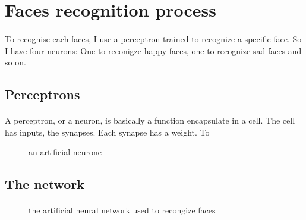 \section{Faces recognition process}

    \paragraph{}{
        To recognise each faces, I use a perceptron trained to recognize a 
     specific face. So I have four neurons: One to reconigze happy faces, one to
     recognize sad faces and so on.
    }

    \subsection{Perceptrons}

    \paragraph{}{
        A perceptron, or a neuron, is basically a function encapsulate in a 
     cell. The cell has inputs, the synapses. Each synapse has a weight. To
     
    }
    
    \begin{figure}[!h]
        \label{fig:neuron}
        \begin{center}
            
        \end{center}
        \caption{an artificial neurone}
    \end{figure}
    
    \paragraph{}{
    
    }

    \paragraph{}{
    }

    \subsection{The network}

    \paragraph{}{
    }

    \begin{figure}[!h]
        \label{fig:ann}
        \begin{center}
            
        \end{center}
        \caption{the artificial neural network used to recongize faces}
    \end{figure}

    \paragraph{}{
    }
